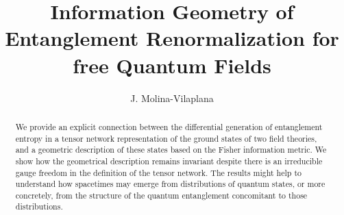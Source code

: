 \documentclass[preprint,aps]{revtex4}
\begin{document}
\preprint{}

\title{Information Geometry of Entanglement Renormalization for free Quantum Fields} %


\author{J. Molina-Vilaplana}




\begin{abstract}
We provide an explicit connection between the differential generation of entanglement entropy in a tensor network representation of the ground states of two  field theories, and a geometric description of these states based on the Fisher information metric. We show how the geometrical description remains invariant despite there is an irreducible gauge freedom in the definition of the tensor network. The results might help to understand how spacetimes may emerge from distributions of quantum states, or more concretely, from the structure of the quantum entanglement concomitant to those distributions.
\end{abstract}

                                                            
\maketitle
\end{document}
